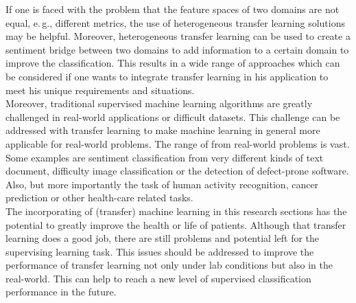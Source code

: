If one is faced with the problem that the feature spaces of two domains are not equal, e.\,g., different metrics, the use of heterogeneous transfer learning solutions may be helpful.
Moreover, heterogeneous transfer learning can be used to create a sentiment bridge between two domains to add information to a certain domain to improve the classification.
This results in a wide range of approaches which can be considered if one wants to integrate transfer learning in his application to meet his unique requirements and situations.\\
Moreover, traditional supervised machine learning algorithms are greatly challenged in real-world applications or difficult datasets.\cite{Pan.2010}
This challenge can be addressed with transfer learning to make machine learning in general more applicable for real-world problems.
The range of from real-world problems is vast.
Some examples are sentiment classification from very different kinds of text document, difficulty image classification or the detection of defect-prone software.\cite{Weiss.2016}
Also, but more importantly the task of human activity recognition, cancer prediction or other health-care related tasks.\cite{Burlina.2017}\cite{Kourou.2015}\\
The incorporating of (transfer) machine learning in this research sections has the potential to greatly improve the health or life of patients.
Although that transfer learning does a good job, there are still problems and potential left for the supervising learning task.
This issues should be addressed to improve the performance of transfer learning not only under lab conditions but also in the real-world.
This can help to reach a new level of supervised classification performance in the future.

